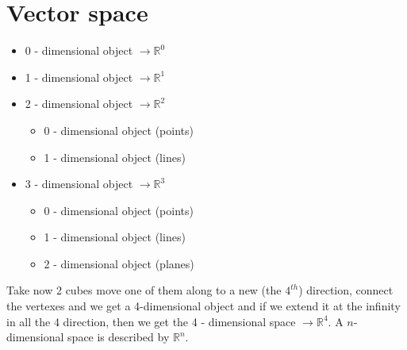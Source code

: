 \section{Vector space}
\begin{itemize}
    \item 0 - dimensional object $\to \mathbb{R}^0$
    \item 1 - dimensional object $\to \mathbb{R}^1$
    \item 2 - dimensional object $\to \mathbb{R}^2$
    \begin{itemize}
        \item 0 - dimensional object (points)
        \item 1 - dimensional object (lines)
    \end{itemize}
    \item 3 - dimensional object $\to \mathbb{R}^3$
    \begin{itemize}
        \item 0 - dimensional object (points)
        \item 1 - dimensional object (lines)
        \item 2 - dimensional object (planes)
    \end{itemize}
\end{itemize}
Take now 2 cubes move one of them along to a new (the $4^{th}$) direction, connect the vertexes and we get a 4-dimensional object and if we extend it at the infinity in all the 4 direction, then we get  the 4 - dimensional space $\to \mathbb{R}^4$. A $n$-dimensional space is  described by $\mathbb{R}^n$.

